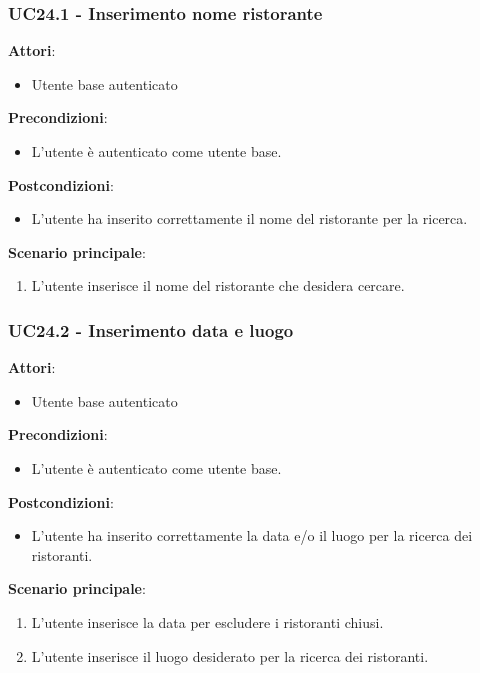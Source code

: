 \subsubsection{UC24.1 - Inserimento nome ristorante
}\label{usecase:24_1}
\textbf{Attori}:
\begin{itemize}
    \item Utente base autenticato
\end{itemize}
\textbf{Precondizioni}:
\begin{itemize}
    \item L'utente è autenticato come utente base.
\end{itemize}
\textbf{Postcondizioni}:
\begin{itemize}
    \item L'utente ha inserito correttamente il nome del ristorante per la ricerca.
\end{itemize}
\textbf{Scenario principale}:
\begin{enumerate}
    \item L'utente inserisce il nome del ristorante che desidera cercare.
\end{enumerate}

\subsubsection{UC24.2 - Inserimento data e luogo
}\label{usecase:24_2}
\textbf{Attori}:
\begin{itemize}
    \item Utente base autenticato
\end{itemize}
\textbf{Precondizioni}:
\begin{itemize}
    \item L'utente è autenticato come utente base.
\end{itemize}
\textbf{Postcondizioni}:
\begin{itemize}
    \item L'utente ha inserito correttamente la data e/o il luogo per la ricerca dei ristoranti.
\end{itemize}
\textbf{Scenario principale}:
\begin{enumerate}
    \item L'utente inserisce la data per escludere i ristoranti chiusi.
    \item L'utente inserisce il luogo desiderato per la ricerca dei ristoranti.
\end{enumerate}



